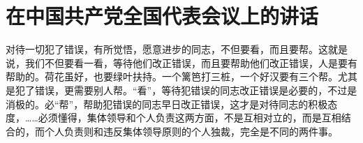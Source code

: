 \section[在中国共产党全国代表会议上的讲话（一九五五年三月）]{在中国共产党全国代表会议上的讲话}


对待一切犯了错误，有所觉悟，愿意进步的同志，不但要看，而且要帮。这就是说，我们不但要看一看，等待他们改正错误，而且要帮助他们改正错误，人是要有帮助的。荷花虽好，也要绿叶扶持。一个篱笆打三桩，一个好汉要有三个帮。尤其是犯了错误，更需要别人帮。“看”，等待犯错误的同志改正错误是必要的，不过是消极的。必“帮”，帮助犯错误的同志早日改正错误，这才是对待同志的积极态度，……必须懂得，集体领导和个人负责这两方面，不是互相对立的，而是互相结合的，而个人负责则和违反集体领导原则的个人独裁，完全是不同的两件事。


